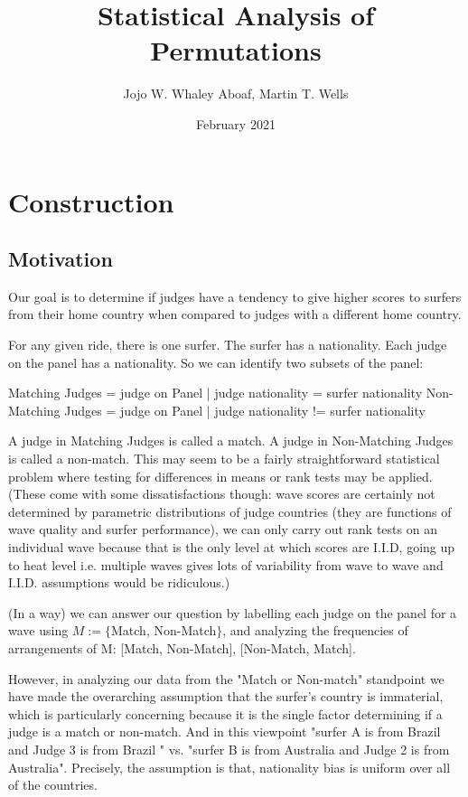 \documentclass{article}
\title{Statistical Analysis of Permutations}
\author{Jojo W. Whaley Aboaf, Martin T. Wells}
\date{February 2021}
\theoremstyle{definition}
\begin{document}
\maketitle
\tableofcontents
\section{Construction}
\subsection{Motivation}
Our goal is to determine if judges have a tendency to give higher scores to surfers from their home country when compared to judges with a different home country.

For any given ride, there is one surfer. The surfer has a nationality. Each judge on the panel has a nationality. So we can identify two subsets of the panel:

Matching Judges = {judge on Panel | judge nationality = surfer nationality }
Non-Matching Judges = {judge on Panel | judge nationality != surfer nationality}

A judge in Matching Judges is called a match. A judge in Non-Matching Judges is called a non-match. This may seem to be a fairly straightforward statistical problem where testing for differences in means or rank tests may be applied. (These come with some dissatisfactions though: wave scores are certainly not determined by parametric distributions of judge countries (they are functions of wave quality and surfer performance), we can only carry out rank tests on an individual wave because that is the only level at which scores are I.I.D, going up to heat level i.e. multiple waves gives lots of variability from wave to wave and I.I.D. assumptions would be ridiculous.)

(In a way) we can answer our question by labelling each judge on the panel for a wave using $M :=\{$Match, Non-Match$\}$, and analyzing the frequencies of arrangements of M: [Match, Non-Match], [Non-Match, Match].

However, in analyzing our data from the "Match or Non-match" standpoint we have made the overarching assumption that the  surfer's country is immaterial, which is particularly concerning because it is the single factor determining if a judge is a match or non-match. And in this viewpoint "surfer A is from Brazil and Judge 3 is from Brazil " vs. "surfer B is from Australia and Judge 2 is from Australia". Precisely, the assumption is that, nationality bias is uniform over all of the countries. 
\end{document}
